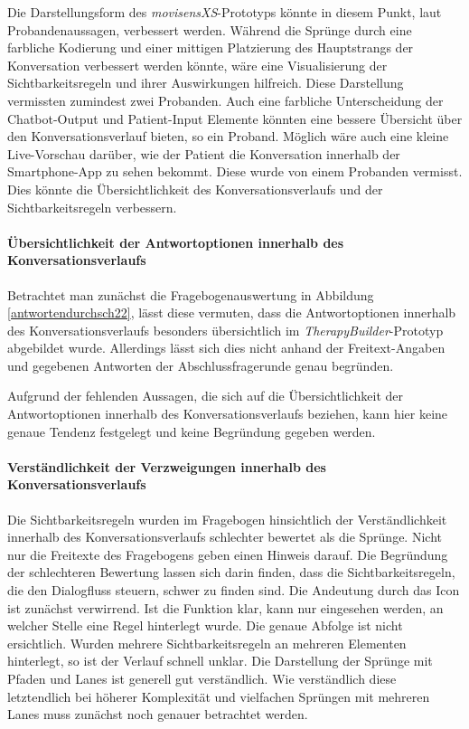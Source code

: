 Die Darstellungsform des \emph{movisensXS}-Prototyps könnte in diesem Punkt, laut Probandenaussagen, verbessert werden. Während die Sprünge durch eine farbliche Kodierung und einer mittigen Platzierung des Hauptstrangs der Konversation verbessert werden könnte, wäre eine Visualisierung der Sichtbarkeitsregeln und ihrer Auswirkungen hilfreich. Diese Darstellung vermissten zumindest zwei Probanden. Auch eine farbliche Unterscheidung der Chatbot-Output und Patient-Input Elemente könnten eine bessere Übersicht über den Konversationsverlauf bieten, so ein Proband. Möglich wäre auch eine kleine Live-Vorschau darüber, wie der Patient die Konversation innerhalb der Smartphone-App zu sehen bekommt. Diese wurde von einem Probanden vermisst. Dies könnte die Übersichtlichkeit des Konversationsverlaufs und der Sichtbarkeitsregeln verbessern. 

\paragraph{Übersichtlichkeit der Antwortoptionen innerhalb des Konversationsverlaufs}
Betrachtet man zunächst die Fragebogenauswertung in Abbildung \ref{antwortendurchsch22}, lässt diese vermuten, dass die Antwortoptionen innerhalb des Konversationsverlaufs besonders übersichtlich im \emph{TherapyBuilder}-Prototyp abgebildet wurde. Allerdings lässt sich dies nicht anhand der Freitext-Angaben und gegebenen Antworten der Abschlussfragerunde genau begründen.

Aufgrund der fehlenden Aussagen, die sich auf die Übersichtlichkeit der Antwortoptionen innerhalb des Konversationsverlaufs beziehen, kann hier keine genaue Tendenz festgelegt und keine Begründung gegeben werden. 

\paragraph{Verständlichkeit der Verzweigungen innerhalb des Konversationsverlaufs}
Die Sichtbarkeitsregeln wurden im Fragebogen hinsichtlich der Verständlichkeit innerhalb des Konversationsverlaufs schlechter bewertet als die Sprünge. Nicht nur die Freitexte des Fragebogens geben einen Hinweis darauf. Die Begründung der schlechteren Bewertung lassen sich darin finden, dass die Sichtbarkeitsregeln, die den Dialogfluss steuern, schwer zu finden sind. Die Andeutung durch das Icon ist zunächst verwirrend. Ist die Funktion klar, kann nur eingesehen werden, an welcher Stelle eine Regel hinterlegt wurde. Die genaue Abfolge ist nicht ersichtlich. Wurden mehrere Sichtbarkeitsregeln an mehreren Elementen hinterlegt, so ist der Verlauf schnell unklar. Die Darstellung der Sprünge mit Pfaden und Lanes ist generell gut verständlich. Wie verständlich diese letztendlich bei höherer Komplexität und vielfachen Sprüngen mit mehreren Lanes muss zunächst noch genauer betrachtet werden. 

